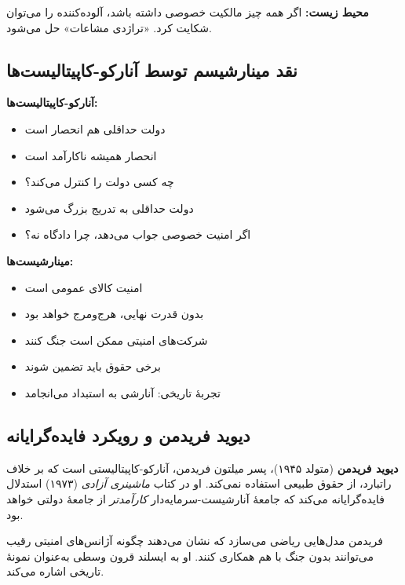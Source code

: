 \textbf{محیط زیست:} اگر همه چیز مالکیت خصوصی داشته باشد، آلوده‌کننده را می‌توان شکایت کرد. «تراژدی مشاعات» حل می‌شود.

\subsection{نقد مینارشیسم توسط آنارکو-کاپیتالیست‌ها}

\begin{tcolorbox}[
    enhanced,
    colback=leftred!8,
    colframe=leftred,
    boxrule=1.5pt,
    arc=5pt,
    fonttitle=\bfseries,
    title={\rl{🔴 موضوع اختلافی: مینارشیسم در برابر آنارکو-کاپیتالیسم}}
]

\textbf{آنارکو-کاپیتالیست‌ها:}
\begin{itemize}
    \item دولت حداقلی هم انحصار است
    \item انحصار همیشه ناکارآمد است
    \item چه کسی دولت را کنترل می‌کند؟
    \item دولت حداقلی به تدریج بزرگ می‌شود
    \item اگر امنیت خصوصی جواب می‌دهد، چرا دادگاه نه؟
\end{itemize}


\textbf{مینارشیست‌ها:}
\begin{itemize}
    \item امنیت کالای عمومی است
    \item بدون قدرت نهایی، هرج‌ومرج خواهد بود
    \item شرکت‌های امنیتی ممکن است جنگ کنند
    \item برخی حقوق باید تضمین شوند
    \item تجربهٔ تاریخی: آنارشی به استبداد می‌انجامد
\end{itemize}
\end{tcolorbox}

\subsection{دیوید فریدمن و رویکرد فایده‌گرایانه}


\textbf{دیوید فریدمن} (متولد ۱۹۴۵)، پسر میلتون فریدمن، آنارکو-کاپیتالیستی است که بر خلاف راتبارد، از حقوق طبیعی استفاده نمی‌کند. او در کتاب \textit{ماشینری آزادی} (۱۹۷۳) استدلال فایده‌گرایانه می‌کند که جامعهٔ آنارشیست-سرمایه‌دار \textit{کارآمدتر} از جامعهٔ دولتی خواهد بود.

فریدمن مدل‌هایی ریاضی می‌سازد که نشان می‌دهند چگونه آژانس‌های امنیتی رقیب می‌توانند بدون جنگ با هم همکاری کنند. او به ایسلند قرون وسطی به‌عنوان نمونهٔ تاریخی اشاره می‌کند.

